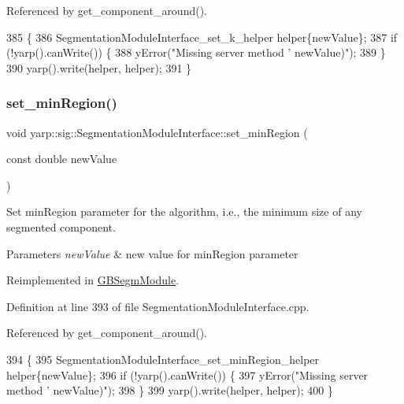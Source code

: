 Referenced by get\+\_\+component\+\_\+around().


\begin{DoxyCode}
385 \{
386     SegmentationModuleInterface\_set\_k\_helper helper\{newValue\};
387     \textcolor{keywordflow}{if} (!yarp().canWrite()) \{
388         yError(\textcolor{stringliteral}{"Missing server method '%
       newValue)"});
389     \}
390     yarp().write(helper, helper);
391 \}
\end{DoxyCode}
\mbox{\label{classyarp_1_1sig_1_1SegmentationModuleInterface_ad9d90ed7e362ae83e2145445a9c4301e}} 
\subsubsection{\texorpdfstring{set\+\_\+min\+Region()}{set\_minRegion()}}
{\footnotesize\ttfamily void yarp\+::sig\+::\+Segmentation\+Module\+Interface\+::set\+\_\+min\+Region (\begin{DoxyParamCaption}\item[{const double}]{new\+Value }\end{DoxyParamCaption})\hspace{0.3cm}{\ttfamily [virtual]}}



Set min\+Region parameter for the algorithm, i.\+e., the minimum size of any segmented component. 


\begin{DoxyParams}{Parameters}
{\em new\+Value} & new value for min\+Region parameter \\
\hline
\end{DoxyParams}


Reimplemented in \hyperlink{classGBSegmModule_ae1c722c9c774cbde4f6bfada3f0826ba}{G\+B\+Segm\+Module}.



Definition at line 393 of file Segmentation\+Module\+Interface.\+cpp.



Referenced by get\+\_\+component\+\_\+around().


\begin{DoxyCode}
394 \{
395     SegmentationModuleInterface\_set\_minRegion\_helper helper\{newValue\};
396     \textcolor{keywordflow}{if} (!yarp().canWrite()) \{
397         yError(\textcolor{stringliteral}{"Missing server method '%
       newValue)"});
398     \}
399     yarp().write(helper, helper);
400 \}
\end{DoxyCode}
\mbox{\label{classyarp_1_1sig_1_1SegmentationModuleInterface_a68f28930df5e930934c0ee56ad1f680c}} 
